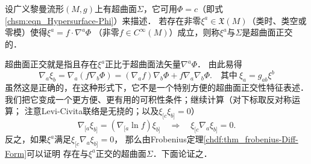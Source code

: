 
\begin{definition}\label{chsm:def_hypersurface-orthogonal}
    设广义黎曼流形$(M,g)$上有超曲面$\Sigma$，它可用$\Phi=c$（即式\eqref{chsm:eqn_Hypersurface-Phi}）来描述．
    若存在非零$\xi^a \in \mathfrak{X}(M)$（类时、类空或零模）使得$\xi^a= f\cdot \nabla^a\Phi$
    （非零$f\in C^\infty(M)$）成立，则称$\xi^a$与$\Sigma$是{\heiti 超曲面正交}的．
\end{definition}

超曲面正交就是指且存在$\xi^a$正比于超曲面法矢量$\nabla^a\Phi$．
由此易得
\begin{equation}
    \nabla_{a} \xi_{b} = \nabla_{a} (f \nabla_{b} \Phi)
      = (\nabla_{a} f) \nabla_{b} \Phi + f \nabla_{a}  \nabla_{b} \Phi .
      \quad \text{其中}\ \xi_a = g_{ab}\xi^b
\end{equation}
虽然这是正确的，在这种形式下，它不是一个特别方便的超曲面正交性特征表述．
我们把它变成一个更方便、更有用的可积性条件；继续计算（对下标取反对称运算；
注意Levi-Civita联络是无挠的；以及$\xi_{[c} \xi_{b]}=0$）
\begin{equation}
    \nabla_{[a} \xi_{b]} = (\nabla_{[a} \ln f) \xi_{b]} \quad   \Rightarrow \quad
    \xi_{[c}\nabla_{a} \xi_{b]} = 0.
\end{equation}
反之，如果$\xi^a$满足$\xi_{[c}\nabla_{a} \xi_{b]} = 0$，
那么由Frobenius定理\ref{chdf:thm_frobenius-Diff-Form}可以证明
存在与$\xi^a$正交的超曲面$\Sigma$．下面论证之．

